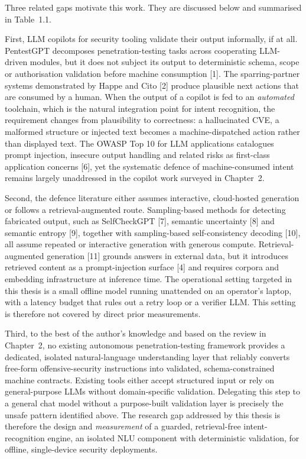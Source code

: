 \documentclass[
]{article}
\begin{document}
Three related gaps motivate this work. They are discussed below and
summarised in Table~1.1.

First, LLM copilots for security tooling validate their output
informally, if at all. PentestGPT decomposes penetration-testing tasks
across cooperating LLM-driven modules, but it does not subject its
output to deterministic schema, scope or authorisation validation before
machine consumption {[}1{]}. The sparring-partner systems demonstrated
by Happe and Cito {[}2{]} produce plausible next actions that are
consumed by a human. When the output of a copilot is fed to an
\emph{automated} toolchain, which is the natural integration point for
intent recognition, the requirement changes from plausibility to
correctness: a hallucinated CVE, a malformed structure or injected text
becomes a machine-dispatched action rather than displayed text. The
OWASP Top 10 for LLM applications catalogues prompt injection, insecure
output handling and related risks as first-class application concerns
{[}6{]}, yet the systematic defence of machine-consumed intent remains
largely unaddressed in the copilot work surveyed in Chapter~2.

Second, the defence literature either assumes interactive, cloud-hosted
generation or follows a retrieval-augmented route. Sampling-based
methods for detecting fabricated output, such as SelfCheckGPT {[}7{]},
semantic uncertainty {[}8{]} and semantic entropy {[}9{]}, together with
sampling-based self-consistency decoding {[}10{]}, all assume repeated
or interactive generation with generous compute. Retrieval-augmented
generation {[}11{]} grounds answers in external data, but it introduces
retrieved content as a prompt-injection surface {[}4{]} and requires
corpora and embedding infrastructure at inference time. The operational
setting targeted in this thesis is a small offline model running
unattended on an operator's laptop, with a latency budget that rules out
a retry loop or a verifier LLM. This setting is therefore not covered by
direct prior measurements.

Third, to the best of the author's knowledge and based on the review in
Chapter~2, no existing autonomous penetration-testing framework provides
a dedicated, isolated natural-language understanding layer that reliably
converts free-form offensive-security instructions into validated,
schema-constrained machine contracts. Existing tools either accept
structured input or rely on general-purpose LLMs without domain-specific
validation. Delegating this step to a general chat model without a
purpose-built validation layer is precisely the unsafe pattern
identified above. The research gap addressed by this thesis is therefore
the design and \emph{measurement} of a guarded, retrieval-free
intent-recognition engine, an isolated NLU component with deterministic
validation, for offline, single-device security deployments.
\end{document}
